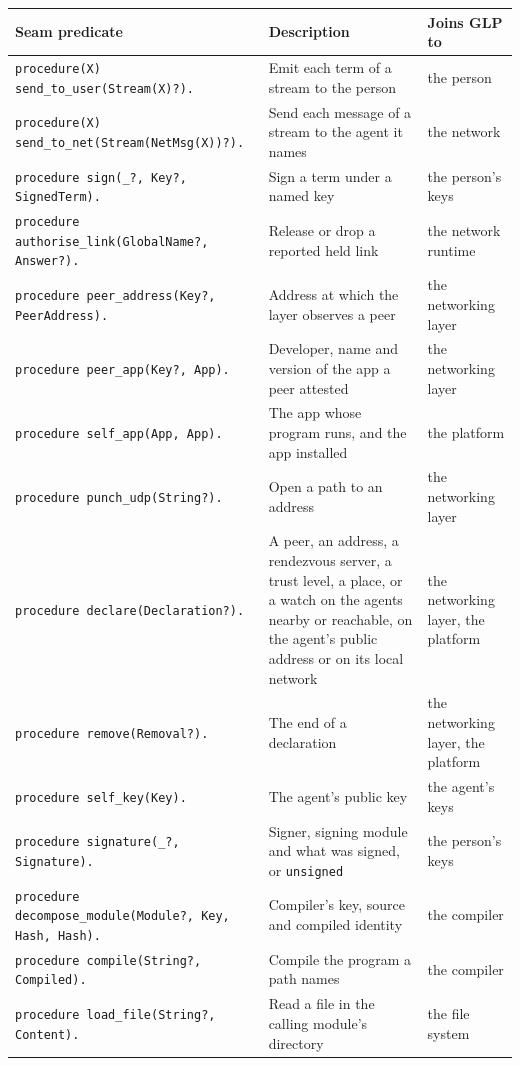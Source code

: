\begin{center}
{\small
\begin{tabular}{lll}
\textbf{Seam predicate} & \textbf{Description} & \textbf{Joins GLP to} \\
\hline
\verb|procedure(X) send_to_user(Stream(X)?).| & Emit each term of a stream to the person & the person \\
\verb|procedure(X) send_to_net(Stream(NetMsg(X))?).| & Send each message of a stream to the agent it names & the network \\
\verb|procedure sign(_?, Key?, SignedTerm).| & Sign a term under a named key & the person's keys \\
\verb|procedure authorise_link(GlobalName?, Answer?).| & Release or drop a reported held link & the network runtime \\
\verb|procedure peer_address(Key?, PeerAddress).| & Address at which the layer observes a peer & the networking layer \\
\verb|procedure peer_app(Key?, App).| & Developer, name and version of the app a peer attested & the networking layer \\
\verb|procedure self_app(App, App).| & The app whose program runs, and the app installed & the platform \\
\verb|procedure punch_udp(String?).| & Open a path to an address & the networking layer \\
\verb|procedure declare(Declaration?).| & A peer, an address, a rendezvous server, a trust level, a place, or a watch on the agents nearby or reachable, on the agent's public address or on its local network & the networking layer, the platform \\
\verb|procedure remove(Removal?).| & The end of a declaration & the networking layer, the platform \\
\verb|procedure self_key(Key).| & The agent's public key & the agent's keys \\
\verb|procedure signature(_?, Signature).| & Signer, signing module and what was signed, or \verb|unsigned| & the person's keys \\
\verb|procedure decompose_module(Module?, Key, Hash, Hash).| & Compiler's key, source and compiled identity & the compiler \\
\verb|procedure compile(String?, Compiled).| & Compile the program a path names & the compiler \\
\verb|procedure load_file(String?, Content).| & Read a file in the calling module's directory & the file system \\
\end{tabular}
}
\end{center}

